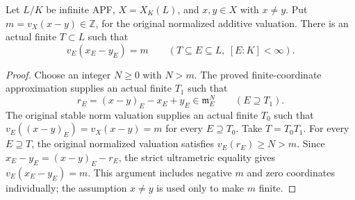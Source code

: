 \begin{lemma}
\label{fw:eventual-coordinate-displacement}
\leanok
Let $L/K$ be infinite APF, $X=X_K(L)$, and $x,y\in X$ with
$x\ne y$. Put $m=v_X(x-y)\in\mathbb Z$, for the original normalized
additive valuation. There is an actual finite $T\subset L$ such that
\[
 v_E(x_E-y_E)=m\qquad(T\subseteq E\subseteq L,\ [E:K]<\infty).
\]
\end{lemma}
\begin{proof}
Choose an integer $N\geq0$ with $N>m$. The proved finite-coordinate
approximation supplies an actual finite $T_1$ such that
\[
 r_E=(x-y)_E-x_E+y_E\in\mathfrak m_E^N
 \qquad(E\supseteq T_1).
\]
The original stable norm valuation supplies an actual finite $T_0$
such that $v_E((x-y)_E)=v_X(x-y)=m$ for every $E\supseteq T_0$.
Take $T=T_0T_1$. For every $E\supseteq T$, the original normalized
valuation satisfies $v_E(r_E)\geq N>m$. Since
$x_E-y_E=(x-y)_E-r_E$, the strict ultrametric equality gives
$v_E(x_E-y_E)=m$. This argument includes negative $m$ and zero
coordinates individually; the assumption $x\ne y$ is used only to
make $m$ finite.
\end{proof}

